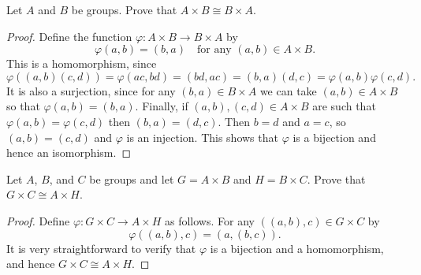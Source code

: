  Let $A$ and $B$ be groups. Prove that
$A\times B\cong B\times A$.
\begin{proof}
  Define the function $\varphi\colon A\times B\to B\times A$ by
  \begin{equation*}
    \varphi(a,b) = (b,a)
    \quad\text{for any $(a,b)\in A\times B$.}
  \end{equation*}
  This is a homomorphism, since
  \begin{equation*}
    \varphi((a,b)(c,d)) = \varphi(ac,bd) = (bd,ac) = (b,a)(d,c)
    = \varphi(a,b)\varphi(c,d).
  \end{equation*}
  It is also a surjection, since for any $(b,a)\in B\times A$ we can
  take $(a,b)\in A\times B$ so that $\varphi(a,b) = (b,a)$. Finally,
  if $(a,b),(c,d)\in A\times B$ are such that
  $\varphi(a,b) = \varphi(c,d)$ then $(b,a) = (d,c)$. Then $b = d$ and
  $a = c$, so $(a,b) = (c,d)$ and $\varphi$ is an injection. This
  shows that $\varphi$ is a bijection and hence an isomorphism.
\end{proof}

 Let $A$, $B$, and $C$ be groups and let $G = A\times B$
and $H = B\times C$. Prove that $G\times C\cong A\times H$.
\begin{proof}
  Define $\varphi\colon G\times C\to A\times H$ as follows. For any
  $((a,b),c)\in G\times C$ by
  \begin{equation*}
    \varphi((a,b),c) = (a,(b,c)).
  \end{equation*}
  It is very straightforward to verify that $\varphi$ is a bijection
  and a homomorphism, and hence $G\times C\cong A\times H$.
\end{proof}

